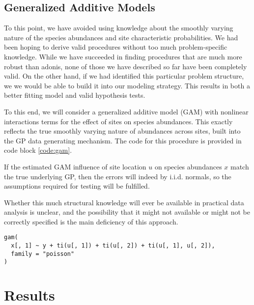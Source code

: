 \documentclass{article}
\newenvironment{code}{\captionsetup{type=listing}}{}
\begin{document}
\subsection{Generalized Additive Models}
\label{subsec:generalized_additive_models}

To this point, we have avoided using knowledge about the smoothly varying nature
of the species abundances and site characteristic probabilities. We had been
hoping to derive valid procedures without too much problem-specific knowledge.
While we have succeeded in finding procedures that are much more robust than
adonis, none of those we have described so far have been completely valid. On
the other hand, if we had identified this particular problem structure, we we
would be able to build it into our modeling strategy. This results in both a
better fitting model and valid hypothesis tests.

To this end, we will consider a generalized additive model (GAM) with nonlinear
interactions terms for the effect of sites on species abundances. This exactly
reflects the true smoothly varying nature of abundances across sites, built into
the GP data generating mechanism. The code for this procedure is provided in
code block \ref{code:gam}.

If the estimated GAM influence of site location $u$ on species abundances $x$
match the true underlying GP, then the errors will indeed by i.i.d. normals, so
the assumptions required for testing will be fulfilled.

Whether this much structural knowledge will ever be available in practical data
analysis is unclear, and the possibility that it might not available or might
not be correctly specified is the main deficiency of this approach.

\begin{code}
\begin{verbatim}
gam(
  x[, 1] ~ y + ti(u[, 1]) + ti(u[, 2]) + ti(u[, 1], u[, 2]),
  family = "poisson"
)
\end{verbatim}
\label{code:gam}
\end{code}

\section{Results}
\label{sec:results}
\end{document}
